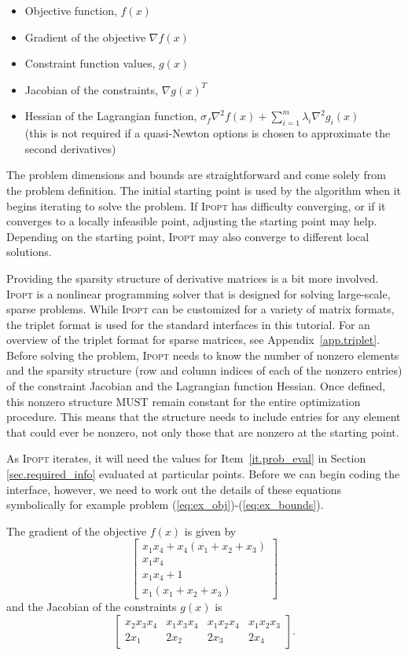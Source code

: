 \documentclass[10pt]{article}
\newcommand{\Ipopt}{\textsc{Ipopt}\xspace}
\begin{document}
\begin{enumerate}
  \begin{itemize}
  \item Objective function, $f(x)$
  \item Gradient of the objective $\nabla f(x)$
  \item Constraint function values, $g(x)$
  \item Jacobian of the constraints, $\nabla g(x)^T$
  \item Hessian of the Lagrangian function, 
    $\sigma_f \nabla^2 f(x) + \sum_{i=1}^m\lambda_i\nabla^2
    g_i(x)$ \\
    (this is not required if a quasi-Newton options is chosen to
    approximate the second derivatives)
  \end{itemize}
\end{enumerate}
The problem dimensions and bounds are
straightforward and come solely from the problem definition. The
initial starting point is used by the algorithm when it begins
iterating to solve the problem. If \Ipopt has difficulty converging, or
if it converges to a locally infeasible point, adjusting the starting
point may help.  Depending on the starting point, \Ipopt may also
converge to different local solutions.

Providing the sparsity structure of derivative matrices is a bit more
involved. \Ipopt is a nonlinear programming solver that is designed
for solving large-scale, sparse problems. While \Ipopt can be
customized for a variety of matrix formats, the triplet format is used
for the standard interfaces in this tutorial. For an overview of the
triplet format for sparse matrices, see Appendix~\ref{app.triplet}.
Before solving the problem, \Ipopt needs to know the number of
nonzero elements and the sparsity structure (row and column indices of
each of the nonzero entries) of the constraint Jacobian and the
Lagrangian function Hessian. Once defined, this nonzero structure MUST
remain constant for the entire optimization procedure. This means that
the structure needs to include entries for any element that could ever
be nonzero, not only those that are nonzero at the starting point.

As \Ipopt iterates, it will need the values for
Item~\ref{it.prob_eval} in Section \ref{sec.required_info} evaluated at
particular points. Before we can begin coding the interface, however,
we need to work out the details of these equations symbolically for
example problem (\ref{eq:ex_obj})-(\ref{eq:ex_bounds}).

The gradient of the objective $f(x)$ is given by
\[
\left[
\begin{array}{c}
x_1 x_4 + x_4 (x_1 + x_2 + x_3) \\
x_1 x_4 \\
x_1 x_4 + 1 \\
x_1 (x_1 + x_2 + x_3)
\end{array}
\right]
\]
and the Jacobian of the constraints $g(x)$ is
\[
\left[
\begin{array}{cccc}
x_2 x_3 x_4     & x_1 x_3 x_4   & x_1 x_2 x_4   & x_1 x_2 x_3   \\
2 x_1           & 2 x_2         & 2 x_3         & 2 x_4
\end{array}
\right].
\]
\end{document}
